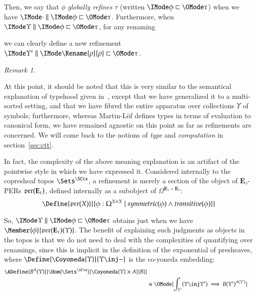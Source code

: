 \documentclass[11pt]{article}
\theoremstyle{definition}
\theoremstyle{notation}
\theoremstyle{remark}
\newtheorem{remark}[thm]{Remark}
\numberwithin{equation}{section}
\newcommand\Exprs{\mathbf{E}}
\begin{document}
Then, we say that $\phi$ \emph{globally refines} $\tau$ (written
$\GloballyRefines{\phi}{\tau}$) when we have $\Refines{\cdot}{\phi}{\tau}$.
Furthermore, when $\Refines{\Upsilon}{\phi}{\tau}$, for any renaming
we can clearly define a new refinement $\Refines{\Upsilon'}{\Rename{\rho}{\rho}}{\tau}$.

\begin{remark}\label{rem:internal}

  At this point, it should be noted that this is very similar to the semantical
  explanation of typehood given in~\cite{martin-lof:1979}, except that we have
  generalized it to a multi-sorted setting, and that we have fibred the entire
  apparatus over collections $\Upsilon$ of symbols; furthermore, whereas
  Martin-L\"of defines types in terms of evaluation to canonical form, we have
  remained agnostic on this point as far as refinements are concerned. We will
  come back to the notions of \emph{type} and \emph{computation} in
  section~\ref{sec:ctt}.

  In fact, the complexity of the above meaning explanation is an artifact of
  the pointwise style in which we have expressed it. Considered internally to
  the copresheaf topos $\Sets^\SCtx$, a refinement is merely a section of the
  object of $\Exprs_\tau$-PERs $\PERs{\Exprs_\tau}$, defined
  internally as a subobject of $\Omega^{\Exprs_\tau\times\Exprs_\tau}$:
  \[
    \Define{
      \PERs{X}
    }{
      \{ \phi : \Omega^{X\times X}
         \mid
         symmetric(\phi)
         \land transitive(\phi)
      \}
    }
  \]

  So, $\Refines{\Upsilon}{\phi}{\tau}$ obtains just when we have
  $\Member{\phi}{\PERs{\Exprs_\tau}(\Upsilon)}$. The benefit of explaining such
  judgments as objects in the topos is that we do not need to deal with
  the complexities of quantifying over renamings, since this is implicit in the
  definition of the exponential of presheaves, where
  $\Define{\Coyoneda{\Upsilon}}{\Upsilon\inj-}$ is the co-yoneda embedding:
  \begin{align*}
    \ADefine{
      B^A(\Upsilon)
    }{
      \Hom{\Sets^\SCtx}{
        \Coyoneda{\Upsilon}\times A
      }{
        B
      }
    }\\
    &\cong
    \OMode{
      \int_{\Upsilon'}
      (\Upsilon\inj\Upsilon')
      \implies
      {B(\Upsilon')}^{A(\Upsilon')}
    }
  \end{align*}


\end{remark}
\end{document}
